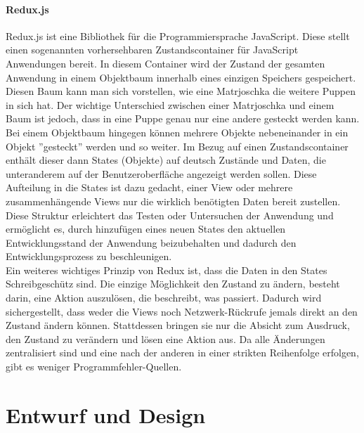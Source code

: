 \documentclass[notables, nomenclature, oneside, 150]{HSMW-Thesis}
\begin{document}
		\paragraph*{Redux.js}
			Redux.js ist eine Bibliothek für die Programmiersprache JavaScript. Diese stellt einen sogenannten vorhersehbaren Zustandscontainer für JavaScript Anwendungen bereit. In diesem Container wird der Zustand der gesamten Anwendung in einem Objektbaum innerhalb eines einzigen Speichers gespeichert. Diesen Baum kann man sich vorstellen, wie eine Matrjoschka die weitere Puppen in sich hat. Der wichtige Unterschied zwischen einer Matrjoschka und einem Baum ist jedoch, dass in eine Puppe genau nur eine andere gesteckt werden kann. Bei einem Objektbaum hingegen können mehrere Objekte nebeneinander in ein Objekt ''gesteckt'' werden und so weiter. Im Bezug auf einen Zustandscontainer enthält dieser dann States (Objekte) auf deutsch Zustände und Daten, die unteranderem auf der Benutzeroberfläche angezeigt werden sollen. Diese Aufteilung in die States ist dazu gedacht, einer View oder mehrere zusammenhängende Views nur die wirklich benötigten Daten bereit zustellen. Diese Struktur erleichtert das Testen oder Untersuchen der Anwendung und ermöglicht es, durch hinzufügen eines neuen States den aktuellen Entwicklungsstand der Anwendung beizubehalten und dadurch den Entwicklungsprozess zu beschleunigen. \\
			Ein weiteres wichtiges Prinzip von Redux ist, dass die Daten in den States Schreibgeschütz sind. Die einzige Möglichkeit den Zustand zu ändern, besteht darin, eine Aktion auszulösen, die beschreibt, was passiert. Dadurch wird sichergestellt, dass weder die Views noch Netzwerk-Rückrufe jemals direkt an den Zustand ändern können. Stattdessen bringen sie nur die Absicht zum Ausdruck, den Zustand zu verändern und lösen eine Aktion aus. Da alle Änderungen zentralisiert sind und eine nach der anderen in einer strikten Reihenfolge erfolgen, gibt es weniger Programmfehler-Quellen.

	\section{Entwurf und Design}\label{ch:entwurfunddesign}
		
\end{document}
